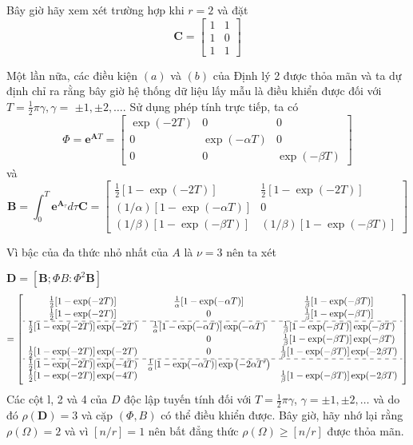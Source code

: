 \documentclass[12pt,a4paper]{article}
\begin{document}
Bây giờ hãy xem xét trường hợp khi $r=2$ và đặt
$$
\mathbf{C}=\left[\begin{array}{ll}
	1 & 1 \\
	1 & 0 \\
	1 & 1
\end{array}\right]
$$

Một lần nữa, các điều kiện $(a)$ và $(b)$ của Định lý 2 được thỏa mãn và ta dự định chỉ ra rằng bây giờ hệ thống dữ liệu lấy mẫu là điều khiển được đối với $T=\frac{1}{2} \pi \gamma, \gamma=$ $\pm 1, \pm 2, \ldots$. Sử dụng phép tính trực tiếp, ta có
$$
\Phi=\mathbf{e}^{\mathbf{A} T}=\left[\begin{array}{ccc}
	\exp (-2 T) & 0 & 0 \\
	0 & \exp (-\alpha T) & 0 \\
	0 & 0 & \exp (-\beta T)
\end{array}\right]
$$
và
$$
\mathbf{B}=\int_0^T \mathbf{e}^{\mathbf{A}_\tau} d \tau \mathbf{C}=\left[\begin{array}{cc}
	\frac{1}{2}[1-\exp (-2 T)] & \frac{1}{2}[1-\exp (-2 T)] \\
	(1 / \alpha)[1-\exp (-\alpha T)] & 0 \\
	(1 / \beta)[1-\exp (-\beta T)] & (1 / \beta)[1-\exp (-\beta T)]
\end{array}\right]
$$

Vì bậc của đa thức nhỏ nhất của $A$ là $\nu=3$ nên ta xét

$\mathbf{D}=\left[\mathbf{B} ; \Phi B: \Phi^2 \mathbf{B}\right]$
{\small
$$=\left[\begin{array}{ccc}\frac{1}{2}[1-\exp (-2 T)] & \frac{1}{\alpha}[1-\exp (-\alpha T)] & \frac{1}{\beta}[1-\exp (-\beta T)] \\ \frac{1}{2}[1-\exp (-2 T)] & 0 & \frac{1}{\beta}[1-\exp (-\beta T)] \\ \hdashline \frac{1}{2}[1-\exp (-2 T)] \exp (-2 T) & \frac{1}{\alpha}[1-\exp (-\alpha T)] \exp (-\alpha T) & \frac{1}{\beta}[1-\exp (-\beta T)] \exp (-\beta T) \\ & 0 & \frac{1}{\beta}[1-\exp (-\beta T)] \exp (-\beta T) \\ \frac{1}{2}[1-\exp (-2 T)] \exp (-2 T) & 0 & \frac{1}{\beta}[1-\exp (-\beta T)] \exp (-2 \beta T) \\ \hdashline \frac{1}{2}[1-\exp (-2 T)] \exp (-4 T) & \frac{1}{\alpha}[1-\exp (-\alpha T)] \exp \left(-2 \alpha T^{\prime}\right) \\ \frac{1}{2}[1-\exp (-2 T)] \exp (-4 T) & & \frac{1}{\beta}[1-\exp (-\beta T)] \exp (-2 \beta T)\end{array}\right]$$
}
Các cột l, 2 và 4 của $D$ độc lập tuyến tính đối với $T=\frac{1}{2} \pi \gamma$, $\gamma= \pm 1, \pm 2, \ldots$ và do đó $\rho(\mathbf{D})=3$ và cặp $(\Phi, B)$ có thể điều khiển được. Bây giờ, hãy nhớ lại rằng $\rho(\Omega)=2$ và vì $[n / r]=1$ nên bất đẳng thức $\rho(\Omega) \geqslant[n / r]$ được thỏa mãn.
\end{document}
